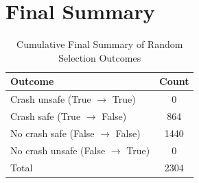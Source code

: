\documentclass{article}
\begin{document}
\section{Final Summary}

\begin{table}[h]
\centering
\caption{Cumulative Final Summary of Random Selection Outcomes}
\begin{tabular}{lc}
\toprule
Outcome & Count \\
\midrule
Crash unsafe (True $\rightarrow$ True) & 0 \\ 
Crash safe (True $\rightarrow$ False) & 864 \\ 
No crash safe (False $\rightarrow$ False) & 1440 \\ 
No crash unsafe (False $\rightarrow$ True) & 0 \\ 
\midrule
Total & 2304 \\ 
\bottomrule
\end{tabular}
\end{table}
\end{document}
